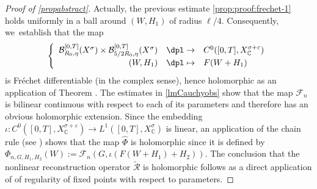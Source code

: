 \documentclass[JEP,XML,SOM,Unicode,published]{cedram}
\newcommand\mto{\mathchoice{\longmapsto}{\mapsto}{\mapsto}{\mapsto}}
\theoremstyle{definition}
\let\mc\mathcal
\let\veps\varepsilon
\newcommand{\B}{\mc{B}}
\newcommand\FL{\mathcal{F}_{n}}
\begin{document}
\begin{proof}[Proof of \cref{propabstract}]
Actually, the previous estimate \eqref{prop:proof:frechet-1} holds uniformly in a ball around $(W, H_1)$ of radius $\ell/4$. Consequently, we~establish that the map
\begin{align*}
\left\{\begin{array}{rcl}
\B_{R_{0}, \eta}^{[0,T]}(X^{\sigma}) \times \B_{5/2R_{0}, \eta}^{[0,T]}(X^{\sigma}) &\dpl\to& C^0([0, T], X_\mathbb{C}^{\sigma+\veps})\\[3pt]
(W, H_1 )&\dpl\mto& F(W+H_1)
\end{array}\right.
\end{align*}
is Fréchet differentiable (in the complex sense), hence holomorphic as an application of Theorem \cite[Th.\,13.16]{Muj86}. The estimates in \cref{lmCauchyobs} show that the map $\FL$ is bilinear continuous with respect to each of its parameters and therefore has an obvious holomorphic extension. Since the embedding $\iota: C^0([0,T],X_{\mathbb{C}}^{\sigma+\veps})\to L^1([0,T],X_{\mathbb{C}}^{\sigma})$ is linear, an application of the chain rule (see \cite[Th.\,13.6]{Muj86}) shows that the map $\widehat{\Phi}$ is holomorphic since it is defined by $\Phi_{n,G,H_{1},H_{2}}(W):=\FL (G,\iota\left(F(W+H_{1})+H_{2}\right)) $. The conclusion that the nonlinear reconstruction operator $\mathcal{\widetilde{R}}$ is holomorphic follows as a direct application of \cite[Th.\,2.2]{1982:chow-hale:bifurcation-theory} of regularity of fixed points with respect to parameters.
\end{proof}
\end{document}
